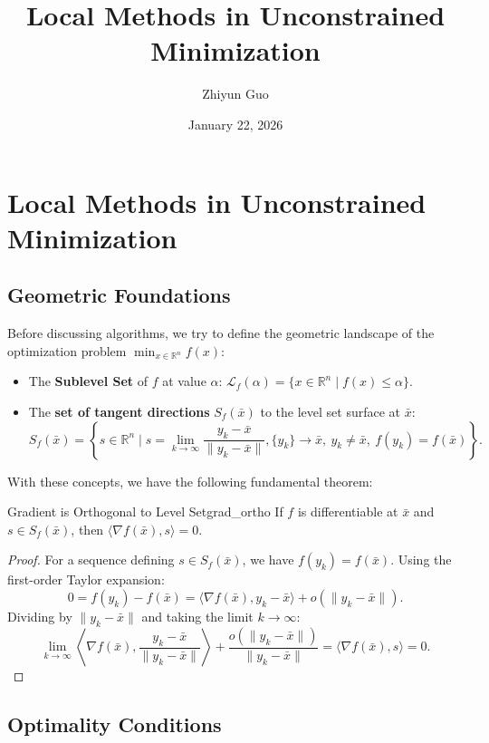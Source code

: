 \documentclass[11pt]{article}
\title{\textbf{\sffamily Local Methods in Unconstrained Minimization}}
\date{January 22, 2026}\fancyhead[R]{\sffamily\footnotesize Local Methods}
\author{Zhiyun Guo}
\begin{document}
\maketitle

\section{Local Methods in Unconstrained Minimization}
\subsection{Geometric Foundations}
Before discussing algorithms, we try to define the geometric landscape of the optimization problem $\min_{x \in \mathbb{R}^n} f(x)$:
\begin{itemize}
        \item The \textbf{Sublevel Set} of $f$ at value $\alpha$: $\mathcal{L}_f(\alpha) = \{ x \in \mathbb{R}^n \mid f(x) \le \alpha \}$.
        \item The \textbf{set of tangent directions} $S_f(\bar{x})$ to the level set surface at $\bar{x}$:
        \[ S_f(\bar{x}) = \left\{ s \in \mathbb{R}^n \mid s = \lim_{k\to\infty} \frac{y_k - \bar{x}}{\|y_k - \bar{x}\|}, \{y_k\}\to\bar{x},\ y_k\ne\bar{x},\ f(y_k)=f(\bar{x}) \right\}. \]
\end{itemize}
With these concepts, we have the following fundamental theorem:
\begin{theorem}{Gradient is Orthogonal to Level Set}{grad_ortho}
    If $f$ is differentiable at $\bar x$ and $s\in S_f(\bar x)$, then $\langle \nabla f(\bar{x}), s \rangle = 0$.
\end{theorem}

\begin{proof}
    For a sequence defining $s\in S_f(\bar{x})$, we have $f(y_k) = f(\bar{x})$. Using the first-order Taylor expansion:
    \[ 0 = f(y_k) - f(\bar{x}) = \langle \nabla f(\bar{x}), y_k - \bar{x} \rangle + o(\|y_k - \bar{x}\|). \]
    Dividing by $\|y_k - \bar{x}\|$ and taking the limit $k \to \infty$:
    \[ \lim_{k \to \infty} \left\langle \nabla f(\bar{x}), \frac{y_k - \bar{x}}{\|y_k - \bar{x}\|} \right\rangle + \frac{o(\|y_k - \bar{x}\|)}{\|y_k - \bar{x}\|} = \langle \nabla f(\bar{x}), s \rangle = 0. \]
\end{proof}

\subsection{Optimality Conditions}
\end{document}
